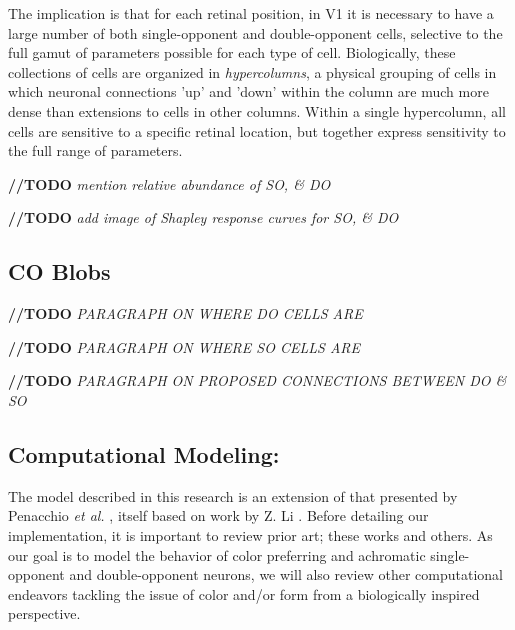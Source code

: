 \documentclass[journal,onecolumn]{IEEEtran}
\begin{document}
The implication is that for each retinal position, in V1 it is necessary to have a large number of both single-opponent and double-opponent cells, selective to the full gamut of parameters possible for each type of cell. Biologically, these collections of cells are organized in \textit{hypercolumns}, a physical grouping of cells in which neuronal connections 'up' and 'down' within the column are much more dense than extensions to cells in other columns. Within a single hypercolumn, all cells are sensitive to a specific retinal location, but together express sensitivity to the full range of parameters.

\bigskip

\textbf{//TODO} \textit{mention relative abundance of SO, \& DO}

\textbf{//TODO} \textit{add image of Shapley response curves for SO, \& DO}

\subsection*{CO Blobs}

\textbf{//TODO} \textit{PARAGRAPH ON WHERE DO CELLS ARE}

\textbf{//TODO} \textit{PARAGRAPH ON WHERE SO CELLS ARE}

\textbf{//TODO} \textit{PARAGRAPH ON PROPOSED CONNECTIONS BETWEEN DO \& SO}


\subsection{Computational Modeling:}

The model described in this research is an extension of that presented by Penacchio \textit{et al.} \cite{otazu:plosive}, itself based on work by Z. Li \cite{li:1998, li:1999}. Before detailing our implementation, it is important to review prior art; these works and others. As our goal is to model the behavior of color preferring and achromatic single-opponent and double-opponent neurons, we will also review other computational endeavors tackling the issue of color and/or form from a biologically inspired perspective.
\end{document}
